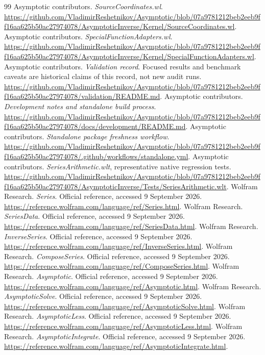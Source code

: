 \documentclass[11pt,letterpaper]{article}
\begin{document}
\begin{thebibliography}{99}
 Asymptotic contributors. \emph{SourceCoordinates.wl}. \url{https://github.com/VladimirReshetnikov/Asymptotic/blob/07a9781212beb2eeb9ff16aa625b50ac27974078/AsymptoticInverse/Kernel/SourceCoordinates.wl}.
 Asymptotic contributors. \emph{SpecialFunctionAdapters.wl}. \url{https://github.com/VladimirReshetnikov/Asymptotic/blob/07a9781212beb2eeb9ff16aa625b50ac27974078/AsymptoticInverse/Kernel/SpecialFunctionAdapters.wl}.
 Asymptotic contributors. \emph{Validation record}. Focused results and benchmark caveats are historical claims of this record, not new audit runs. \url{https://github.com/VladimirReshetnikov/Asymptotic/blob/07a9781212beb2eeb9ff16aa625b50ac27974078/validation/README.md}.
 Asymptotic contributors. \emph{Development notes and standalone build process}. \url{https://github.com/VladimirReshetnikov/Asymptotic/blob/07a9781212beb2eeb9ff16aa625b50ac27974078/docs/development/README.md}.
 Asymptotic contributors. \emph{Standalone package freshness workflow}. \url{https://github.com/VladimirReshetnikov/Asymptotic/blob/07a9781212beb2eeb9ff16aa625b50ac27974078/.github/workflows/standalone.yml}.
 Asymptotic contributors. \emph{SeriesArithmetic.wlt}, representative native regression tests. \url{https://github.com/VladimirReshetnikov/Asymptotic/blob/07a9781212beb2eeb9ff16aa625b50ac27974078/AsymptoticInverse/Tests/SeriesArithmetic.wlt}.
 Wolfram Research. \emph{Series}. Official reference, accessed 9 September 2026. \url{https://reference.wolfram.com/language/ref/Series.html}.
 Wolfram Research. \emph{SeriesData}. Official reference, accessed 9 September 2026. \url{https://reference.wolfram.com/language/ref/SeriesData.html}.
 Wolfram Research. \emph{InverseSeries}. Official reference, accessed 9 September 2026. \url{https://reference.wolfram.com/language/ref/InverseSeries.html}.
 Wolfram Research. \emph{ComposeSeries}. Official reference, accessed 9 September 2026. \url{https://reference.wolfram.com/language/ref/ComposeSeries.html}.
 Wolfram Research. \emph{Asymptotic}. Official reference, accessed 9 September 2026. \url{https://reference.wolfram.com/language/ref/Asymptotic.html}.
 Wolfram Research. \emph{AsymptoticSolve}. Official reference, accessed 9 September 2026. \url{https://reference.wolfram.com/language/ref/AsymptoticSolve.html}.
 Wolfram Research. \emph{AsymptoticLess}. Official reference, accessed 9 September 2026. \url{https://reference.wolfram.com/language/ref/AsymptoticLess.html}.
 Wolfram Research. \emph{AsymptoticIntegrate}. Official reference, accessed 9 September 2026. \url{https://reference.wolfram.com/language/ref/AsymptoticIntegrate.html}.
\end{thebibliography}
\end{document}
